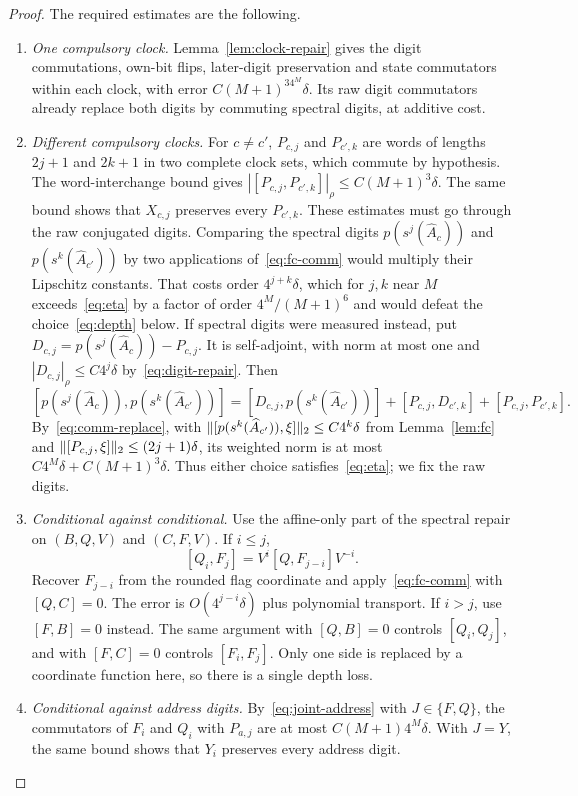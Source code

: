 \begin{proof}
The required estimates are the following.
\begin{enumerate}[label=(\roman*),leftmargin=*,itemsep=2pt]
\item \emph{One compulsory clock.} Lemma~\ref{lem:clock-repair} gives the digit commutations, own-bit flips, later-digit preservation and state commutators within each clock, with error $C(M+1)^34^M\delta$. Its raw digit commutators already replace both digits by commuting spectral digits, at additive cost.
\item \emph{Different compulsory clocks.} For $c\ne c'$, $P_{c,j}$ and $P_{c',k}$ are words of lengths $2j+1$ and $2k+1$ in two complete clock sets, which commute by hypothesis. The word-interchange bound gives $|[P_{c,j},P_{c',k}]|_\rho\le C(M+1)^3\delta$. The same bound shows that $X_{c,j}$ preserves every $P_{c',k}$. These estimates must go through the raw conjugated digits. Comparing the spectral digits $p(s^j(\widehat A_c))$ and $p(s^k(\widehat A_{c'}))$ by two applications of~\eqref{eq:fc-comm} would multiply their Lipschitz constants. That costs order $4^{j+k}\delta$, which for $j,k$ near $M$ exceeds~\eqref{eq:eta} by a factor of order $4^M/(M+1)^6$ and would defeat the choice~\eqref{eq:depth} below. If spectral digits were measured instead, put $D_{c,j}=p(s^j(\widehat A_c))-P_{c,j}$. It is self-adjoint, with norm at most one and $|D_{c,j}|_\rho\le C4^j\delta$ by~\eqref{eq:digit-repair}. Then
\[
 [p(s^j(\widehat A_c)),p(s^k(\widehat A_{c'}))]
 =[D_{c,j},p(s^k(\widehat A_{c'}))]+[P_{c,j},D_{c',k}]+[P_{c,j},P_{c',k}].
\]
By~\eqref{eq:comm-replace}, with $\lVert[p(s^k(\widehat A_{c'})),\xi]\rVert_2\le C4^k\delta$ from Lemma~\ref{lem:fc} and $\lVert[P_{c,j},\xi]\rVert_2\le(2j+1)\delta$, its weighted norm is at most $C4^M\delta+C(M+1)^3\delta$. Thus either choice satisfies~\eqref{eq:eta}; we fix the raw digits.
\item \emph{Conditional against conditional.} Use the affine-only part of the spectral repair on $(B,Q,V)$ and $(C,F,V)$. If $i\le j$,
\[
 [Q_i,F_j]=V^i[Q,F_{j-i}]V^{-i}.
\]
Recover $F_{j-i}$ from the rounded flag coordinate and apply~\eqref{eq:fc-comm} with $[Q,C]=0$. The error is $O(4^{j-i}\delta)$ plus polynomial transport. If $i>j$, use $[F,B]=0$ instead. The same argument with $[Q,B]=0$ controls $[Q_i,Q_j]$, and with $[F,C]=0$ controls $[F_i,F_j]$. Only one side is replaced by a coordinate function here, so there is a single depth loss.
\item \emph{Conditional against address digits.} By~\eqref{eq:joint-address} with $J\in\{F,Q\}$, the commutators of $F_i$ and $Q_i$ with $P_{a,j}$ are at most $C(M+1)4^M\delta$. With $J=Y$, the same bound shows that $Y_i$ preserves every address digit.

\end{enumerate}
\end{proof}

